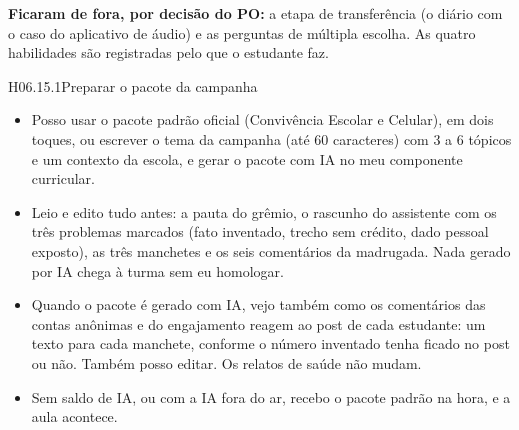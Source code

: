 \textbf{Ficaram de fora, por decisão do PO:} a etapa de transferência (o
diário com o caso do aplicativo de áudio) e as perguntas de múltipla escolha.
As quatro habilidades são registradas pelo que o estudante faz.

\begin{historia}{H06.15.1}{Preparar o pacote da campanha}{\pronto}
\aceite
\begin{itemize}
  \item Posso usar o pacote padrão oficial (Convivência Escolar e Celular),
    em dois toques, ou escrever o tema da campanha (até 60 caracteres) com 3 a
    6 tópicos e um contexto da escola, e gerar o pacote com IA no meu
    componente curricular.
  \item Leio e edito tudo antes: a pauta do grêmio, o rascunho do assistente
    com os três problemas marcados (fato inventado, trecho sem crédito, dado
    pessoal exposto), as três manchetes e os seis comentários da madrugada.
    Nada gerado por IA chega à turma sem eu homologar.
  \item Quando o pacote é gerado com IA, vejo também como os comentários das
    contas anônimas e do engajamento reagem ao post de cada estudante: um
    texto para cada manchete, conforme o número inventado tenha ficado no post
    ou não. Também posso editar. Os relatos de saúde não mudam.
  \item Sem saldo de IA, ou com a IA fora do ar, recebo o pacote padrão na
    hora, e a aula acontece.
\end{itemize}
\end{historia}


